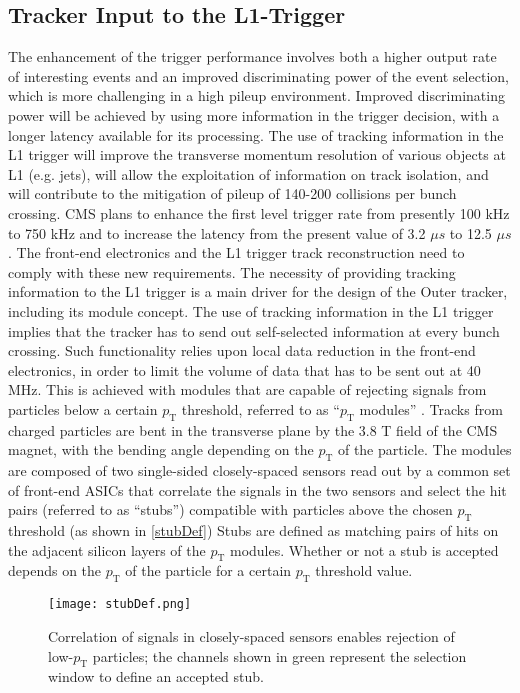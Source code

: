 \subsection{Tracker Input to the L1-Trigger}

The enhancement of the trigger performance involves both a higher output rate of interesting events and an improved discriminating power of the event selection, which is more challenging in a high pileup environment. Improved discriminating power will be achieved by using more information in the trigger decision, with a longer latency available for its processing. The use of tracking information in the L1 trigger will improve the transverse momentum resolution of various objects at L1 (e.g. jets), will allow the exploitation of information on track isolation, and will contribute to the mitigation of pileup of  140-200 collisions per bunch crossing. CMS plans to enhance the first level trigger rate from presently 100 kHz to 750 kHz and to increase the latency from the present value of 3.2 $\mu s$ to 12.5 $\mu s$. The front-end electronics and the L1 trigger track reconstruction need to comply with these new requirements. The necessity of providing tracking information to the L1 trigger is a main driver for the design of the Outer tracker, including its module concept. The use of tracking information in the L1 trigger implies that the tracker has to send out self-selected information at every bunch crossing. Such functionality relies upon local data reduction in the front-end electronics, in order to limit the volume of data that has to be sent out at 40 MHz. This is achieved with modules that are capable of rejecting signals from particles below a certain $p_\text{T}$ threshold, referred to as ``$p_\text{T}$ modules'' \cite{Phase2Tracker1}. Tracks from charged particles are bent in the transverse plane by the 3.8 T field of the CMS magnet, with the bending angle depending on the $p_\text{T}$ of the particle. The modules are composed of two single-sided closely-spaced sensors read out by a common set of front-end ASICs that correlate the signals in the two sensors and select the hit pairs (referred to as ``stubs'') compatible with particles above the chosen $p_\text{T}$ threshold (as shown in \autoref{stubDef}) Stubs are defined as matching pairs of hits on the adjacent silicon layers of the $p_\text{T}$ modules. Whether or not a stub is accepted depends on the $p_\text{T}$ of the particle for a certain $p_\text{T}$ threshold value.

\begin{figure}[tb]
\begin{center}
\texttt{[image: stubDef.png]} 
\caption{Correlation of signals in closely-spaced sensors enables rejection of low-$p_\text{T}$ particles; the channels shown in green represent the selection window to define an accepted stub.}
\label{stubDef} 
\end{center}
\end{figure}

